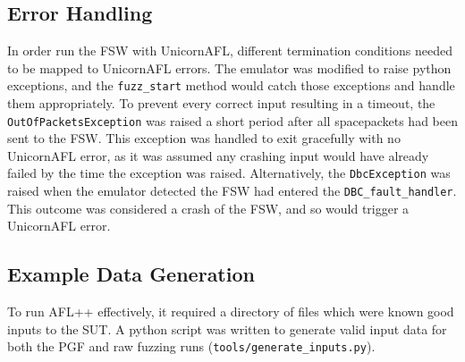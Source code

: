 \documentclass[../report.tex]{subfiles}
\begin{document}
\subsection{Error Handling} \label{sec:fuzz-err}

In order run the FSW with UnicornAFL, different termination conditions needed
to be mapped to UnicornAFL errors. The emulator was modified to raise python
exceptions, and the \lstinline|fuzz_start| method would catch those exceptions
and handle them appropriately. To prevent every correct input resulting in a
timeout, the \lstinline|OutOfPacketsException| was raised a short period after
all spacepackets had been sent to the FSW. This exception was handled to exit
gracefully with no UnicornAFL error, as it was assumed any crashing input would
have already failed by the time the exception was raised. Alternatively, the
\lstinline|DbcException| was raised when the emulator detected the FSW had
entered the \lstinline|DBC_fault_handler|. This outcome was considered a crash
of the FSW, and so would trigger a UnicornAFL error.

\subsection{Example Data Generation}

To run AFL++ effectively, it required a directory of files which were known
good inputs to the SUT. A python script was written to generate valid input
data for both the PGF and raw fuzzing runs
(\lstinline|tools/generate_inputs.py|).
\end{document}

